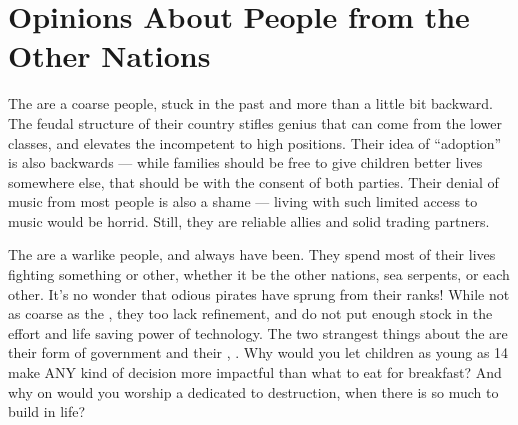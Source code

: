 \documentclass[blue]{GL2020}
\begin{document}
\section*{Opinions About People from the Other Nations}
The \pFarmers{} are a coarse people, stuck in the past and more than a little bit backward. The feudal structure of their country stifles genius that can come from the lower classes, and elevates the incompetent to high positions. Their idea of ``adoption'' is also backwards — while families should be free to give children better lives somewhere else, that should be with the consent of both parties. Their denial of music from most people is also a shame — living with such limited access to music would be horrid. Still, they are reliable allies and solid trading partners.

The \pShippies{} are a warlike people, and always have been. They spend most of their lives fighting something or other, whether it be the other nations, sea serpents, or each other. It's no wonder that odious pirates have sprung from their ranks! While not as coarse as the \pFarmers{}, they too lack refinement, and do not put enough stock in the effort and life saving power of technology. The two strangest things about the \pShippies{} are their form of government and their \cEbb{\Deity}, \cEbb{}. Why would you let children as young as 14 make ANY kind of decision more impactful than what to eat for breakfast? And why on \pEarth{} would you worship a \cEbb{\Deity} dedicated to destruction, when there is so much to build in life?
   				 
\end{document}
